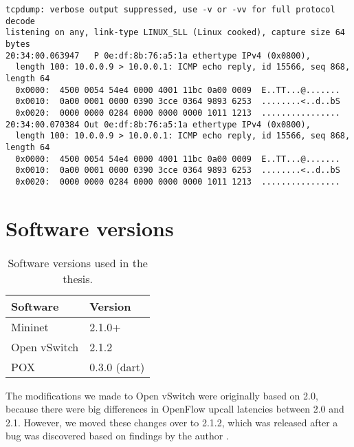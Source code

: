 \begin{Verbatim}
tcpdump: verbose output suppressed, use -v or -vv for full protocol decode
listening on any, link-type LINUX_SLL (Linux cooked), capture size 64 bytes
20:34:00.063947   P 0e:df:8b:76:a5:1a ethertype IPv4 (0x0800), 
  length 100: 10.0.0.9 > 10.0.0.1: ICMP echo reply, id 15566, seq 868, length 64
  0x0000:  4500 0054 54e4 0000 4001 11bc 0a00 0009  E..TT...@.......
  0x0010:  0a00 0001 0000 0390 3cce 0364 9893 6253  ........<..d..bS
  0x0020:  0000 0000 0284 0000 0000 0000 1011 1213  ................
20:34:00.070384 Out 0e:df:8b:76:a5:1a ethertype IPv4 (0x0800), 
  length 100: 10.0.0.9 > 10.0.0.1: ICMP echo reply, id 15566, seq 868, length 64
  0x0000:  4500 0054 54e4 0000 4001 11bc 0a00 0009  E..TT...@.......
  0x0010:  0a00 0001 0000 0390 3cce 0364 9893 6253  ........<..d..bS
  0x0020:  0000 0000 0284 0000 0000 0000 1011 1213  ................
\end{Verbatim}

\section{Software versions}
\label{chapter:software.versions}

\begin{table}[H]
  \centering
  \begin{tabular}{ll}
  \hline
    \textbf{Software} & \textbf{Version} \\
  \hline
    Mininet & 2.1.0+ \\
    Open vSwitch & 2.1.2 \\
    POX & 0.3.0 (dart) \\
  \hline
  \end{tabular}
  \caption{Software versions used in the thesis.}
  \label{table:software.versions}
\end{table}

The modifications we made to Open vSwitch were
originally based on 2.0, because there were big differences in OpenFlow
upcall latencies between 2.0 and 2.1.  However, we moved these changes over
to 2.1.2, which was released after a bug was discovered based on findings by
the author \cite{ovs.bug}.
